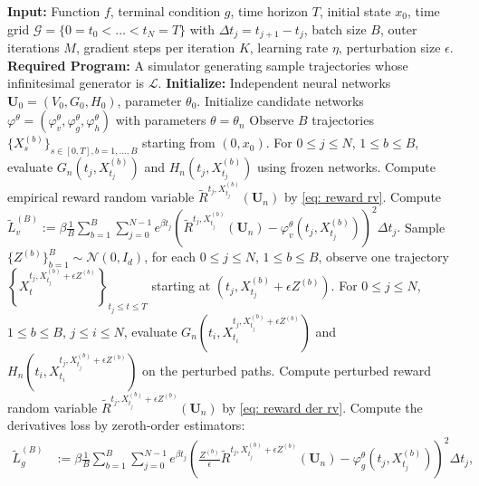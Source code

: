 \documentclass[twoside,11pt]{article}
\newcommand{\1}{\mathbf{1}}
\numberwithin{equation}{section}
\begin{document}
\begin{algorithm}
\caption{Zeroth-Order PDE Solver via Independent Networks}\label{alg:zo}
\begin{algorithmic}[1] %
\State \textbf{Input:} Function $f$, terminal condition $g$, time horizon $T$, initial state $x_0$, time grid $ \mathcal{G} = \{0=t_0<\dots<t_N= T\}$ with $ \Delta t_j = t_{j+1} - t_j$, batch size $ B$, outer iterations $M$, gradient steps per iteration $K$, learning rate $\eta$, perturbation size $\epsilon$.
\State \textbf{Required Program:} A simulator generating sample trajectories whose infinitesimal generator is $\mathcal L$.
\State \textbf{Initialize:} Independent neural networks $\mathbf{U}_0 = (V_0, G_0, H_0)$, parameter $\theta_0$.
    \State Initialize candidate networks $\varphi^{\theta} = (\varphi^{\theta}_v, \varphi^{\theta}_g, \varphi^{\theta}_h)$ with parameters $\theta = \theta_n$
        \State Observe $ B$ trajectories $ \{X^{(b)}_{s}\}_{s\in[0,T],b = 1,\dots,B}$ starting from $ (0,x_0)$.
        \State For $ 0\le j \le N$, $ 1\le b \le B$, evaluate $G_{n}(t_j,X_{t_j}^{(b)})$ and $H_{n}(t_j,X_{t_j}^{(b)})$ using frozen networks.
        \State Compute empirical reward random variable $ \tilde R^{t_j,X^{(b)}_{t_j}}(\mathbf{U}_n)$ by \eqref{eq: reward rv}.
        \State Compute $\tilde L^{(B)}_v :=  \beta\frac{1}{B}\sum_{b=1}^B\sum_{j=0}^{N-1}e^{\beta t_j}\left( \tilde R^{t_j,X_{t_j}^{(b)}}(\mathbf{U}_n) - \varphi^{\theta}_v(t_j,X_{t_j}^{(b)})\right)^2\Delta t_j.$
        \State Sample $\{Z^{(b)}\}_{b=1}^B \sim \mathcal{N}(0,I_d)$, for each $ 0\le j \le N$, $ 1\le b \le B$, observe one trajectory $ \left\{ X_{t}^{t_j,X_{t_j}^{(b)}+\epsilon Z^{(b)}}\right\}_{t_j\le t\le T}$ starting at $ (t_j,X_{t_j}^{(b)}+\epsilon Z^{(b)})$.
        \State For $ 0\le j\le N$, $ 1\le b\le B$, $ j\le i\le N$, evaluate $G_{n}(t_i,X_{t_i}^{t_j,X_{t_j}^{(b)}+\epsilon Z^{(b)}})$ and $H_{n}(t_i,X_{t_i}^{t_j,X_{t_j}^{(b)}+\epsilon Z^{(b)}})$ on the perturbed paths.
        \State Compute perturbed reward random variable $ \tilde R^{t_j,X_{t_j}^{(b)}+\epsilon Z^{(b)}}(\mathbf{U}_n)$ by \eqref{eq: reward der rv}.
        \State Compute the derivatives loss by zeroth-order estimators:
         \begin{align*}
        \tilde L^{(B)}_g &:= \beta\frac{1}{B}\sum_{b = 1}^{B}\sum_{j = 0}^{N-1} e^{\beta t_j}\left( \frac{Z^{(b)}}{\epsilon}\tilde R^{t_j,X_{t_j}^{(b)}+\epsilon Z^{(b)}}(\mathbf{U}_n) - \varphi^{\theta}_g(t_j,X_{t_j}^{(b)})\right)^2 \Delta t_j,\\

\end{align*}
\end{algorithmic}
\end{algorithm}
\end{document}
